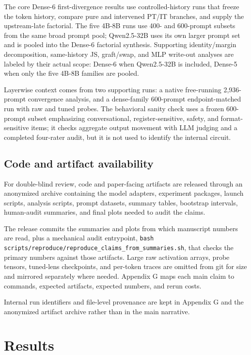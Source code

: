 \documentclass[11pt]{article}
\begin{document}
The core Dense-6 first-divergence results use controlled-history runs that freeze the token history, compare pure and intervened PT/IT branches, and supply the upstream-late factorial. The five 4B-8B runs use 400- and 600-prompt subsets from the same broad prompt pool; Qwen2.5-32B uses its own larger prompt set and is pooled into the Dense-6 factorial synthesis. Supporting identity/margin decomposition, same-history JS, graft/swap, and MLP write-out analyses are labeled by their actual scope: Dense-6 when Qwen2.5-32B is included, Dense-5 when only the five 4B-8B families are pooled.

Layerwise context comes from two supporting runs: a native free-running 2,936-prompt convergence analysis, and a dense-family 600-prompt endpoint-matched run with raw and tuned probes. The behavioral sanity check uses a frozen 600-prompt subset emphasizing conversational, register-sensitive, safety, and format-sensitive items; it checks aggregate output movement with LLM judging and a completed four-rater audit, but it is not used to identify the internal circuit.

\subsection{Code and artifact availability}

For double-blind review, code and paper-facing artifacts are released through an anonymized archive containing the model adapters, experiment packages, launch scripts, analysis scripts, prompt datasets, summary tables, bootstrap intervals, human-audit summaries, and final plots needed to audit the claims.

The release commits the summaries and plots from which manuscript numbers are read, plus a mechanical audit entrypoint, \texttt{bash scripts/reproduce/reproduce\_claims\_from\_summaries.sh}, that checks the primary numbers against those artifacts. Large raw activation arrays, probe tensors, tuned-lens checkpoints, and per-token traces are omitted from git for size and mirrored separately where needed. Appendix G maps each main claim to commands, expected artifacts, expected numbers, and rerun costs.

Internal run identifiers and file-level provenance are kept in Appendix G and the anonymized artifact archive rather than in the main narrative.


\section{Results}
\end{document}
